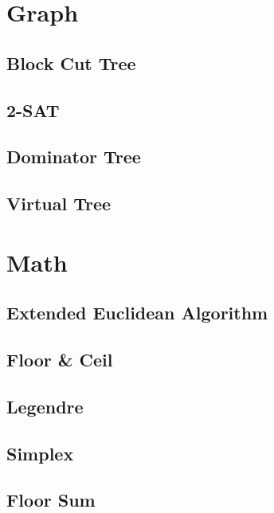\documentclass{article}
\begin{document}
\section{Graph}

\subsection{Block Cut Tree}


\subsection{2-SAT}


\subsection{Dominator Tree}


\subsection{Virtual Tree}


\section{Math}

\subsection{Extended Euclidean Algorithm}


\subsection{Floor \& Ceil}


\subsection{Legendre}


\subsection{Simplex}


\subsection{Floor Sum}

\end{document}
